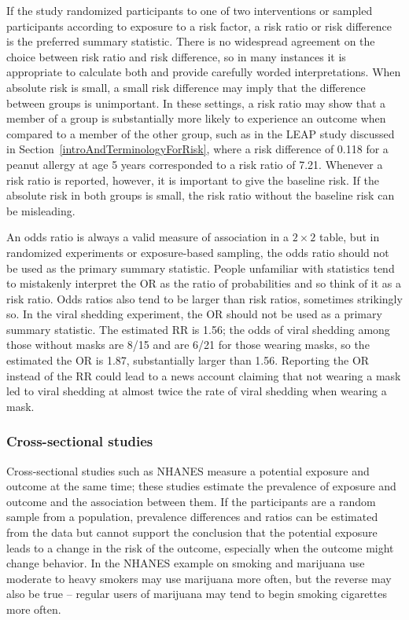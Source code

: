 If the study randomized participants to one of two interventions or sampled participants according to exposure to a risk factor, a risk ratio or risk difference is the preferred summary statistic.  There is no widespread agreement on the choice between risk ratio and risk difference, so in many instances it is appropriate to calculate both and provide carefully worded interpretations. When absolute risk is small, a small risk difference may imply that the difference between groups is unimportant. In these settings, a risk ratio may show that a member of a group is substantially more likely to experience an outcome when compared to a member of the other group, such as in the LEAP study discussed in Section~\ref{introAndTerminologyForRisk}, where a risk difference of 0.118 for a peanut allergy at age 5 years corresponded to a risk ratio of 7.21.  Whenever a risk ratio is reported, however, it is important to give the baseline risk.  If the absolute risk in both groups is small, the risk ratio without the baseline risk can be misleading.

An odds ratio is always a valid measure of association in a $2 \times 2$ table, but in randomized experiments or exposure-based sampling, the odds ratio should not be used as the primary summary statistic.  People unfamiliar with statistics tend to mistakenly interpret the OR as the ratio of probabilities and so think of it as a risk ratio.  Odds ratios also tend to be larger than risk ratios, sometimes strikingly so.  In the viral shedding experiment, the OR should not be used as a primary summary statistic. The estimated RR is 1.56; the odds of viral shedding among those without masks are 8/15 and are 6/21 for those wearing masks, so the estimated the OR is 1.87, substantially larger than 1.56. Reporting the OR instead of the RR could lead to a news account claiming that not wearing a mask led to viral shedding at almost twice the rate of viral shedding when wearing a mask.

\subsubsection{Cross-sectional studies}

Cross-sectional studies such as NHANES measure a potential exposure and outcome at the same time; these studies estimate the prevalence of exposure and outcome and the association between them.  If the participants are a random sample from a population, prevalence differences and ratios can be estimated from the data but cannot support the conclusion that the potential exposure leads to a change in the risk of the outcome, especially when the outcome might change behavior. In the NHANES example on smoking and marijuana use moderate to heavy smokers may use marijuana more often, but the reverse may also be true -- regular users of marijuana may tend to begin smoking cigarettes more often.

